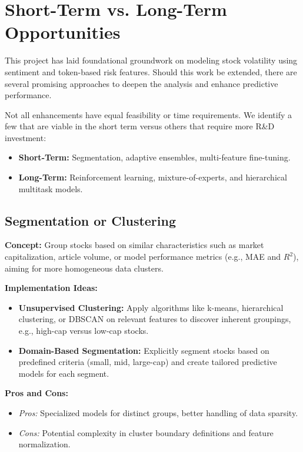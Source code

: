 \documentclass[twocolumn]{article}
\begin{document}
\section{Short-Term vs. Long-Term Opportunities}

This project has laid foundational groundwork on modeling stock volatility using sentiment and token-based risk features. Should this work be extended, there are several promising approaches to deepen the analysis and enhance predictive performance.

Not all enhancements have equal feasibility or time requirements. We identify a few that are viable in the short term versus others that require more R\&D investment:

\begin{itemize} 
    \item \textbf{Short-Term:} Segmentation, adaptive ensembles, multi-feature fine-tuning.
    \item \textbf{Long-Term:} Reinforcement learning, mixture-of-experts, and hierarchical multitask models.
\end{itemize}

\subsection{Segmentation or Clustering}

\textbf{Concept:} 
Group stocks based on similar characteristics such as market capitalization, article volume, or model performance metrics (e.g., MAE and $R^2$), aiming for more homogeneous data clusters.

\textbf{Implementation Ideas:}

\begin{itemize}
    \item \textbf{Unsupervised Clustering:} Apply algorithms like k-means, hierarchical clustering, or DBSCAN on relevant features to discover inherent groupings, e.g., high-cap versus low-cap stocks.
    \item \textbf{Domain-Based Segmentation:} Explicitly segment stocks based on predefined criteria (small, mid, large-cap) and create tailored predictive models for each segment.
\end{itemize}

\textbf{Pros and Cons:}
\begin{itemize}
    \item \textit{Pros:} Specialized models for distinct groups, better handling of data sparsity.
    \item \textit{Cons:} Potential complexity in cluster boundary definitions and feature normalization.
\end{itemize}
\end{document}

